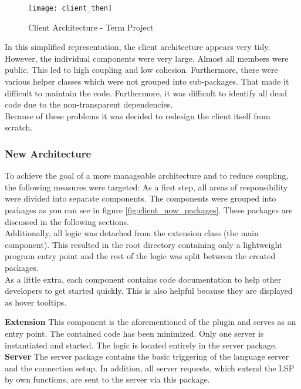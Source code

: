 \begin{figure}[H]
    \centering
    \texttt{[image: client\_then]}
    \caption{Client Architecture - Term Project}
    \label{fig:client_then}
\end{figure}

In this simplified representation, the client architecture appears very tidy.
However, the individual components were very large.
Almost all members were public. This led to high coupling and low cohesion.
Furthermore, there were various helper classes which were not grouped into sub-packages.
That made it difficult to maintain the code. Furthermore,
it was difficult to identify all dead code due to the non-transparent dependencies. \\

Because of these problems it was decided to redesign the client itself from scratch.

\subsubsection{New Architecture}
To achieve the goal of a more manageable architecture and to reduce coupling, the following measures were targeted:
As a first step, all areas of responsibility were divided into separate components.
The components were grouped into packages as you can see in figure \ref{fig:client_now_packages}.
These packages are discussed in the following sections. \\

Additionally, all logic was detached from the extension class (the main component).
This resulted in the root directory containing only a lightweight program entry point
and the rest of the logic was split between the created packages. \\

As a little extra, each component contains code documentation to help other developers to get started quickly. This is also helpful because they are displayed as hover tooltips.


{\bf Extension} \textendash{}
This component is the aforementioned  of the plugin and serves as an entry point. The contained code has been minimized. Only one server is instantiated and started. The logic is located entirely in the server package. \\

{\bf Server} \textendash{}
The server package contains the basic triggering  of the language server and the connection setup. In addition, all server requests, which extend the LSP by own functions, are sent to the server via this package. \\

